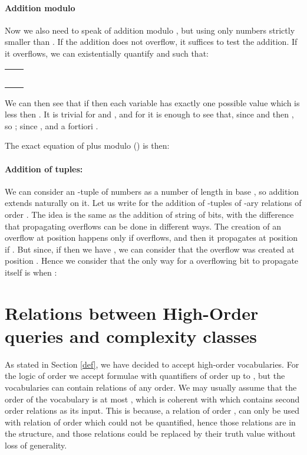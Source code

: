 \documentclass[a4paper,12pt]{article}
\theoremstyle{definition}
\begin{document}
\paragraph{Addition modulo }
Now we also need to speak of addition modulo , but using only
numbers strictly smaller than .  If the addition does not overflow,
it suffices to test the addition. If it overflows, we can
existentially quantify  and  such that:

\begin{tabular}{ll}
  &\\
  & \\
  &\\
& \\
  &\\
\end{tabular}

We can then see that if  then each variable has exactly
one possible value which is less then . It is trivial for  and
, and for  it is enough to see that, since  and  then , so ;  since , and a fortiori
.

The exact equation of plus modulo () is then:
\\
\paragraph{Addition of tuples:}
We can consider an -tuple of numbers as a number of length  in
base , so addition extends naturally on it. Let us write
 for the addition of -tuples of -ary relations of
order . The idea is the same as the addition of string of bits,
with the difference that propagating overflows can be done in
different ways. The creation of an overflow at position  happens
only if  overflows, and then it
propagates at position  if . But since, if
 then we have , we can
consider that the overflow was created at position . Hence we
consider that the only way for a overflowing bit to propagate itself
is when :




\section{Relations between High-Order queries and complexity classes}\label{equ}
As stated in Section \ref{def}, we have decided to accept high-order
vocabularies. For the logic of order  we accept formulae with
quantifiers of order up to , but the vocabularies can contain
relations of any order. We may usually assume that the order of the
vocabulary is at most , which is coherent with \FO{} which
contains second order relations as its input. This is because, a
relation of order , can only be used with relation of order 
which could not be quantified, hence those relations are in the
structure, and those relations could be replaced by their truth
value without loss of generality.
\end{document}
